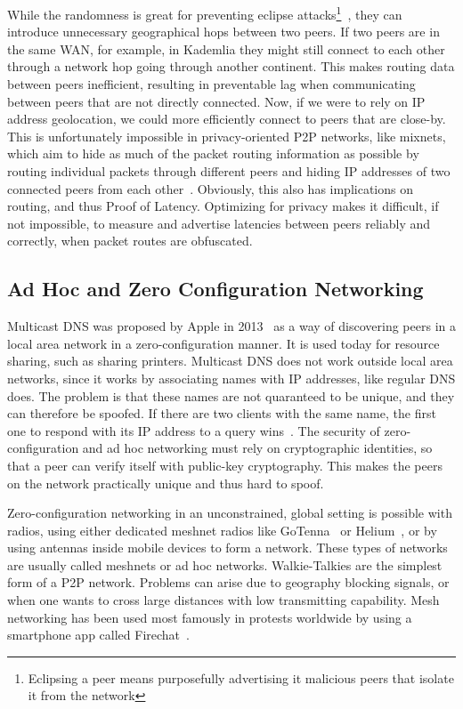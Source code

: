 While the randomness is great for preventing eclipse attacks\footnote{Eclipsing a peer means purposefully advertising it malicious peers that isolate it from the network}~\cite{Cai2015-ra}, they can introduce unnecessary geographical hops between two peers. If two peers are in the same WAN, for example, in Kademlia they might still connect to each other through a network hop going through another continent. This makes routing data between peers inefficient, resulting in preventable lag when communicating between peers that are not directly connected.
Now, if we were to rely on IP address geolocation, we could more efficiently connect to peers that are close-by. This is unfortunately impossible in privacy-oriented P2P networks, like mixnets, which aim to hide as much of the packet routing information as possible by routing individual packets through different peers and hiding IP addresses of two connected peers from each other~\cite{Harry_Halpin_undated-sq}. Obviously, this also has implications on routing, and thus Proof of Latency. Optimizing for privacy makes it difficult, if not impossible, to measure and advertise latencies between peers reliably and correctly, when packet routes are obfuscated.

\subsection{Ad Hoc and Zero Configuration Networking}
Multicast DNS was proposed by Apple in 2013~\cite{Cheshire2013-ja} as a way of discovering peers in a local area network in a zero-configuration manner. It is used today for resource sharing, such as sharing printers. Multicast DNS does not work outside local area networks, since it works by associating names with IP addresses, like regular DNS does. The problem is that these names are not quaranteed to be unique, and they can therefore be spoofed. If there are two clients with the same name, the first one to respond with its IP address to a query wins~\cite{Pdp2008-tg}. The security of zero-configuration and ad hoc networking must rely on cryptographic identities, so that a peer can verify itself with public-key cryptography. This makes the peers on the network practically unique and thus hard to spoof.

Zero-configuration networking in an unconstrained, global setting is possible with radios, using either dedicated meshnet radios like GoTenna~\cite{GoTenna_undated-km} or Helium~\cite{Helium_undated-jv}, or by using antennas inside mobile devices to form a network. These types of networks are usually called meshnets or ad hoc networks. Walkie-Talkies are the simplest form of a P2P network. Problems can arise due to geography blocking signals, or when one wants to cross large distances with low transmitting capability. Mesh networking has been used most famously in protests worldwide by using a smartphone app called Firechat~\cite{Milian2014-mt}.

